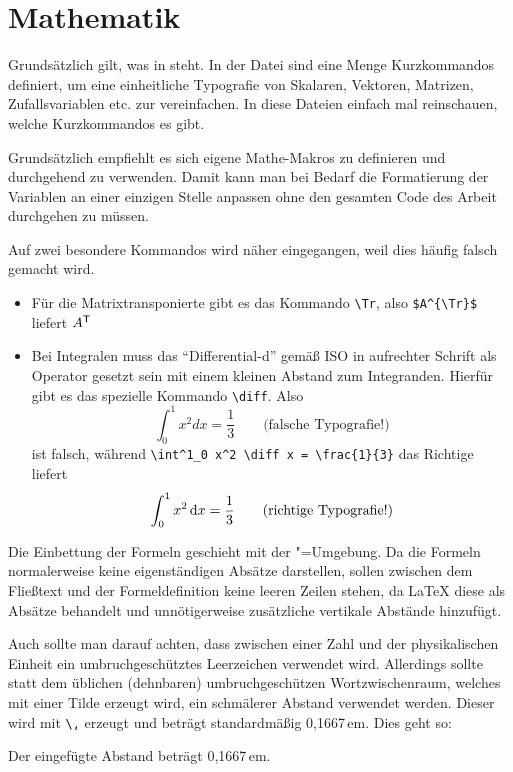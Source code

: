 \section{Mathematik}%
\label{sec:Mathe}
%
Grundsätzlich gilt, was in \parencites{ams1999a}{ams1999b} steht. In der Datei
 sind eine Menge Kurzkommandos definiert,
um eine einheitliche Typografie von
Skalaren, Vektoren, Matrizen,
Zufallsvariablen etc. zur vereinfachen.
In diese Dateien einfach mal reinschauen, welche Kurzkommandos es gibt.

Grundsätzlich empfiehlt es sich eigene Mathe-Makros zu definieren und durchgehend zu verwenden.
Damit kann man bei Bedarf die Formatierung der Variablen an einer einzigen Stelle anpassen
ohne den gesamten Code des Arbeit durchgehen zu müssen.

Auf zwei besondere Kommandos wird näher eingegangen,
weil dies häufig falsch gemacht wird.
\begin{itemize}
  \item Für die Matrixtransponierte gibt es das Kommando \verb#\Tr#, also
	\verb#$A^{\Tr}$# liefert $A^{\mathsf{T}}$
	
	\item Bei Integralen muss das \enquote{Differential-d} gemäß
	ISO in aufrechter Schrift als Operator gesetzt sein mit einem kleinen Abstand
	zum Integranden. Hierfür gibt es das spezielle Kommando \verb#\diff#. Also
	\begin{equation}
	 \int^1_0 x^2 d x = \frac{1}{3} \qquad \text{(falsche Typografie!)}
	\end{equation}
	ist falsch, während \verb#\int^1_0 x^2 \diff x = \frac{1}{3}# das Richtige
	liefert
	\begin{equation}
	 \int^1_0 x^2 \mathop{}\!\mathrm{d} x = \frac{1}{3} \qquad \text{(richtige Typografie!)}
	\end{equation}
\end{itemize}

Die Einbettung der Formeln geschieht mit der "=Umgebung.
Da die Formeln normalerweise keine eigenständigen Absätze darstellen,
sollen zwischen dem Fließtext und der Formeldefinition keine leeren Zeilen stehen,
da \LaTeX{} diese als Absätze behandelt und unnötigerweise zusätzliche vertikale Abstände hinzufügt.

Auch sollte man darauf achten, dass zwischen einer Zahl und der physikalischen Einheit ein umbruchgeschütztes Leerzeichen verwendet wird.
Allerdings sollte statt dem üblichen (dehnbaren) umbruchgeschützen Wortzwischenraum, 
welches mit einer Tilde erzeugt wird, ein schmälerer Abstand verwendet werden.
Dieser wird mit \verb+\,+  erzeugt und beträgt standardmäßig 0,1667\,em. Dies geht so:
\begin{latex}
Der eingefügte Abstand beträgt 0,1667\,em.
\end{latex}